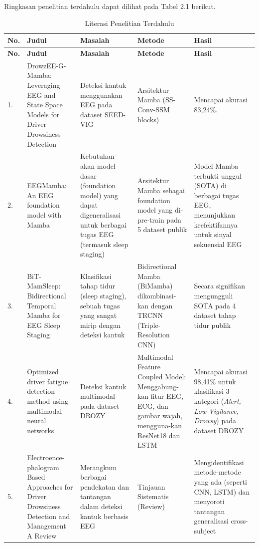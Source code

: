 Ringkasan penelitian terdahulu dapat dilihat pada Tabel 2.1 berikut.\par
\begin{longtable}{| b{}|p{}|p{}|p{}|p{}|} %
	\caption{Literasi Penelitian Terdahulu}
	\label{table:2.literasi}\\
	\hline
	\textbf{No.} & \textbf{Judul} & \textbf{Masalah} & \textbf{Metode} & \textbf{Hasil} \\
	\hline
	\endfirsthead %
	\hline
	\textbf{No.} & \textbf{Judul} & \textbf{Masalah} & \textbf{Metode} & \textbf{Hasil} \\
	\hline
	\endhead %
	1. & DrowzEE-G-Mamba: Leveraging EEG and State Space Models for Driver Drowsiness Detection & Deteksi kantuk menggunakan EEG pada dataset SEED-VIG & Arsitektur Mamba (SS-Conv-SSM blocks) & Mencapai akurasi 83,24\%.\\ 
	\hline
	2. & EEGMamba: An EEG foundation model with Mamba & Kebutuhan akan model dasar (foundation model) yang dapat digeneralisasi untuk berbagai tugas EEG (termasuk sleep staging) & Arsitektur Mamba sebagai foundation model yang di-pre-train pada 5 dataset publik & Model Mamba terbukti unggul (SOTA) di berbagai tugas EEG, menunjukkan keefektifannya untuk sinyal sekuensial EEG\\ 
	\hline
	3. & BiT-MamSleep: Bidirectional Temporal Mamba for EEG Sleep Staging & Klasifikasi tahap tidur (sleep staging), sebuah tugas yang sangat mirip dengan deteksi kantuk & Bidirectional Mamba (BiMamba) dikombinasi-kan dengan TRCNN (Triple-Resolution CNN) & Secara signifikan mengungguli SOTA pada 4 dataset tahap tidur publik\\ 
	\hline
	4. & Optimized driver fatigue detection method using multimodal neural networks & Deteksi kantuk multimodal pada dataset DROZY & Multimodal Feature Coupled Model: Menggabung-kan fitur EEG, ECG, dan gambar wajah, mengguna-kan ResNet18 dan LSTM & Mencapai akurasi 98,41\% untuk klasifikasi 3 kategori (\textit{Alert, Low Vigilance, Drowsy}) pada dataset DROZY\\
	\hline
	5. & Electroence-phalogram Based Approaches for Driver Drowsiness Detection and Management A Review & Merangkum berbagai pendekatan dan tantangan dalam deteksi kantuk berbasis EEG & Tinjauan Sistematis (Review) & Mengidentifikasi metode-metode yang ada (seperti CNN, LSTM) dan menyoroti tantangan generalisasi cross-subject\\
	\hline
\end{longtable}

